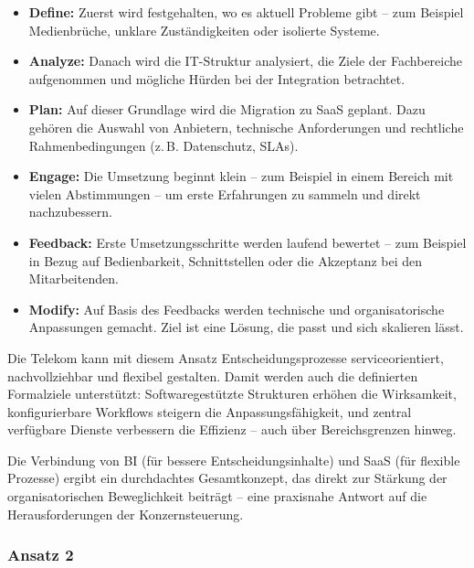 \documentclass[12pt,a4paper]{article}
\begin{document}
	\begin{itemize}
		\item \textbf{Define:} Zuerst wird festgehalten, wo es aktuell Probleme gibt – zum Beispiel Medienbrüche, unklare Zuständigkeiten oder isolierte Systeme.
		
		\item \textbf{Analyze:} Danach wird die IT-Struktur analysiert, die Ziele der Fachbereiche aufgenommen und mögliche Hürden bei der Integration betrachtet.
		
		\item \textbf{Plan:} Auf dieser Grundlage wird die Migration zu SaaS geplant. Dazu gehören die Auswahl von Anbietern, technische Anforderungen und rechtliche Rahmenbedingungen (z.\,B. Datenschutz, SLAs).
		
		\item \textbf{Engage:} Die Umsetzung beginnt klein – zum Beispiel in einem Bereich mit vielen Abstimmungen – um erste Erfahrungen zu sammeln und direkt nachzubessern.
		
		\item \textbf{Feedback:} Erste Umsetzungsschritte werden laufend bewertet – zum Beispiel in Bezug auf Bedienbarkeit, Schnittstellen oder die Akzeptanz bei den Mitarbeitenden.
		
		\item \textbf{Modify:} Auf Basis des Feedbacks werden technische und organisatorische Anpassungen gemacht. Ziel ist eine Lösung, die passt und sich skalieren lässt.
	\end{itemize}
	
	\noindent Die Telekom kann mit diesem Ansatz Entscheidungsprozesse serviceorientiert, nachvollziehbar und flexibel gestalten. Damit werden auch die definierten Formalziele unterstützt: Softwaregestützte Strukturen erhöhen die Wirksamkeit, konfigurierbare Workflows steigern die Anpassungsfähigkeit, und zentral verfügbare Dienste verbessern die Effizienz – auch über Bereichsgrenzen hinweg.
	
	\noindent Die Verbindung von BI (für bessere Entscheidungsinhalte) und SaaS (für flexible Prozesse) ergibt ein durchdachtes Gesamtkonzept, das direkt zur Stärkung der organisatorischen Beweglichkeit beiträgt – eine praxisnahe Antwort auf die Herausforderungen der Konzernsteuerung.
	
	\subsubsection{Ansatz 2}
	
\end{document}
